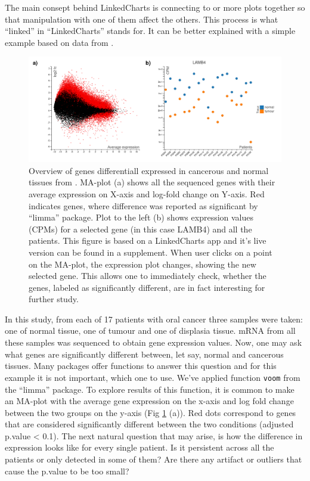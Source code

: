\documentclass[twocolumn,10pt]{article}
\begin{document}
The main consept behind LinkedCharts is connecting to or more plots together so that manipulation with one of them affect the others. This process is what ``linked'' in ``LinkedCharts'' stands for. It can be better explained with a simple example based on data from \citet{conway_2015}.

\begin{figure}
	\includegraphics[width=\textwidth]{FigD/figD.png}
	\caption{Overview of genes differentiall expressed in cancerous and normal tissues from \citet{conway_2015}. MA-plot (a) shows all the sequenced genes with their average expression on X-axis and log-fold change on Y-axis. Red indicates genes, where difference was reported as significant by ``limma'' package. Plot to the left (b) shows expression values (CPMs) for a selected gene (in this case LAMB4) and all the patients. This figure is based on a LinkedCharts app and it's live version can be found in a supplement. When user clicks on a point on the MA-plot, the expression plot changes, showing the new selected gene. This allows one to immediately check, whether the genes, labeled as significantly different, are in fact interesting for further study.}
	\label{FigD}
\end{figure}

In this study, from each of 17 patients with oral cancer three samples were taken: one of normal tissue, one of tumour and one of displasia tissue. mRNA from all these samples was sequenced to obtain gene expression values. Now, one may ask what genes are significantly different between, let say, normal and cancerous tissues. Many packages offer functions to answer this question and for this example it is not important, which one to use. We've applied function \texttt{voom} from the ``limma'' \citep{ritchie_2015} package. To explore results of this function, it is common to make an MA-plot with the average gene expression on the x-axis and log fold change between the two groups on the y-axis (Fig \ref{FigD} (a)). Red dots correspond to genes that are considered significantly different between the two conditions (adjusted p.value < 0.1). The next natural question that may arise, is how the difference in expression looks like for every single patient. Is it persistent across all the patients or only detected in some of them? Are there any artifact or outliers that cause the p.value to be too small?
\end{document}
